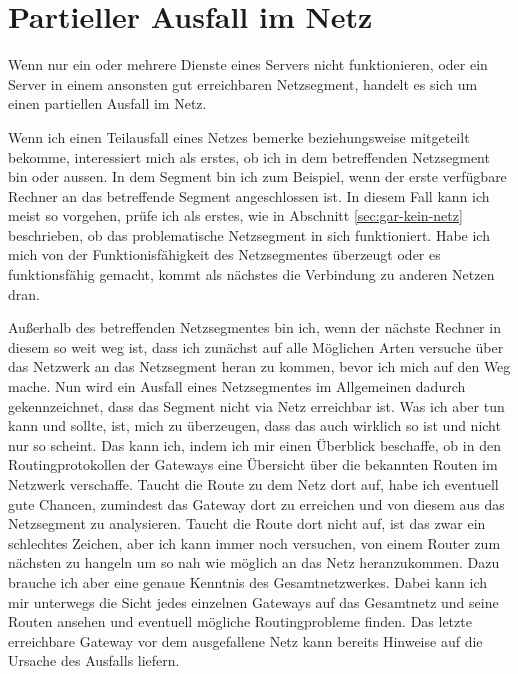 \chapter{Partieller Ausfall im Netz}
\label{cha:netz-teilausfall}

\begin{abstractsec}
  Wenn nur ein oder mehrere Dienste eines Servers nicht funktionieren, oder
  ein Server in einem ansonsten gut erreichbaren Netzsegment, handelt es sich
  um einen partiellen Ausfall im Netz.
\end{abstractsec}

\begin{normaltext}
  Wenn ich einen Teilausfall eines Netzes bemerke beziehungsweise mitgeteilt
  bekomme, interessiert mich als erstes, ob ich in dem betreffenden
  Netzsegment bin oder aussen. In dem Segment bin ich zum Beispiel, wenn der
  erste verfügbare Rechner an das betreffende Segment angeschlossen ist. In
  diesem Fall kann ich meist so vorgehen, prüfe ich als erstes, wie in
  Abschnitt \ref{sec:gar-kein-netz} beschrieben, ob das problematische
  Netzsegment in sich funktioniert. Habe ich mich von der Funktionisfähigkeit
  des Netzsegmentes überzeugt oder es funktionsfähig gemacht, kommt als
  nächstes die Verbindung zu anderen Netzen dran.

  Außerhalb des betreffenden Netzsegmentes bin ich, wenn der nächste Rechner
  in diesem so weit weg ist, dass ich zunächst auf alle Möglichen Arten
  versuche über das Netzwerk an das Netzsegment heran zu kommen, bevor ich
  mich auf den Weg mache. Nun wird ein Ausfall eines Netzsegmentes im
  Allgemeinen dadurch gekennzeichnet, dass das Segment nicht via Netz
  erreichbar ist. Was ich aber tun kann und sollte, ist, mich zu überzeugen,
  dass das auch wirklich so ist und nicht nur so scheint. Das kann ich, indem
  ich mir einen Überblick beschaffe, ob in den Routingprotokollen der Gateways
  eine Übersicht über die bekannten Routen im Netzwerk verschaffe. Taucht die
  Route zu dem Netz dort auf, habe ich eventuell gute Chancen, zumindest das
  Gateway dort zu erreichen und von diesem aus das Netzsegment zu analysieren.
  Taucht die Route dort nicht auf, ist das zwar ein schlechtes Zeichen, aber
  ich kann immer noch versuchen, von einem Router zum nächsten zu hangeln um
  so nah wie möglich an das Netz heranzukommen. Dazu brauche ich aber eine
  genaue Kenntnis des Gesamtnetzwerkes. Dabei kann ich mir unterwegs die Sicht
  jedes einzelnen Gateways auf das Gesamtnetz und seine Routen ansehen und
  eventuell mögliche Routingprobleme finden. Das letzte erreichbare Gateway
  vor dem ausgefallene Netz kann bereits Hinweise auf die Ursache des Ausfalls
  liefern.


\end{normaltext}
